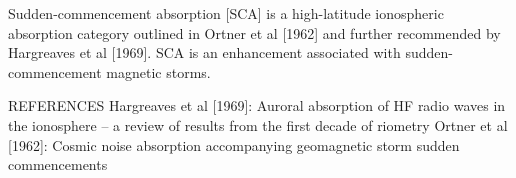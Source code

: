 

Sudden-commencement absorption [SCA] is a high-latitude ionospheric
absorption category outlined in Ortner et al [1962] and further
recommended by Hargreaves et al [1969]. SCA is an enhancement
associated with sudden-commencement magnetic storms.



REFERENCES
Hargreaves et al [1969]: Auroral absorption of HF radio waves in the
ionosphere -- a review of results from the first decade of riometry
Ortner et al [1962]: Cosmic noise absorption accompanying geomagnetic storm
sudden commencements 
